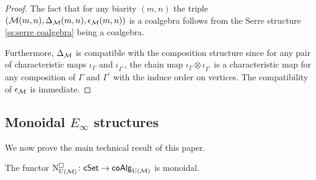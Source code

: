 \begin{proof}
	The fact that for any biarity $(m,n)$ the triple $(\mathcal{M}(m,n), \Delta_{\mathcal{M}}(m,n), \epsilon_{\mathcal{M}}(m,n))$ is a coalgebra follows from the Serre structure \cref{ss:serre coalgebra} being a coalgebra.
	
	Furthermore, $\Delta_{\mathcal{M}}$ is compatible with the composition structure since for any pair of characteristic maps $\iota_\Gamma$ and $\iota_{\Gamma^\prime}$, the chain map $\iota_\Gamma \otimes \iota_{\Gamma^\prime}$ is a characteristic map for any composition of $\Gamma$ and $\Gamma^\prime$ with the induce order on vertices.
	The compatibility of $\epsilon_{\mathcal{M}}$ is immediate.
\end{proof}

\subsection{Monoidal $E_\infty$ structures}

We now prove the main technical result of this paper.

\begin{theorem} \label{t:cubical e-infty chains are monoidal}
	The functor $\operatorname{N^{\square}_{{\operatorname{U}(\mathcal{M})}}} \colon \mathsf{cSet} \to \mathsf{coAlg}_{\operatorname{U}(\mathcal{M})}$ is monoidal.
\end{theorem}

